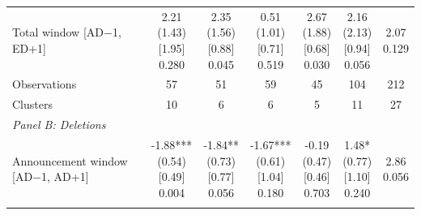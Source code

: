 \begin{threeparttable}
\begin{tabular}{@{}lcccccc}
Total window [AD$-$1, ED+1] & \makecell{2.21\\(1.43)\\{}[1.95]\\{0.280}} & \makecell{2.35\\(1.56)\\{}[0.88]\\{0.045}} & \makecell{0.51\\(1.01)\\{}[0.71]\\{0.519}} & \makecell{2.67\\(1.88)\\{}[0.68]\\{0.030}} & \makecell{2.16\\(2.13)\\{}[0.94]\\{0.056}} & \makecell{2.07\\{0.129}} \\
\addlinespace[0.25ex]
\addlinespace[0.25ex]
Observations & 57 & 51 & 59 & 45 & 104 & 212 \\
\addlinespace[0.25ex]
\addlinespace[0.25ex]
Clusters & 10 & 6 & 6 & 5 & 11 & 27 \\
\addlinespace[0.25ex]
\midrule
\emph{Panel B: Deletions} \\
\addlinespace[0.25ex]
\addlinespace[1ex]
Announcement window [AD$-$1, AD+1] & \makecell{-1.88***\\(0.54)\\{}[0.49]\\{0.004}} & \makecell{-1.84**\\(0.73)\\{}[0.77]\\{0.056}} & \makecell{-1.67***\\(0.61)\\{}[1.04]\\{0.180}} & \makecell{-0.19\\(0.47)\\{}[0.46]\\{0.703}} & \makecell{1.48*\\(0.77)\\{}[1.10]\\{0.240}} & \makecell{2.86\\{0.056}} \\
\addlinespace[0.25ex]
\addlinespace[0.25ex]

\end{tabular}
\end{threeparttable}
